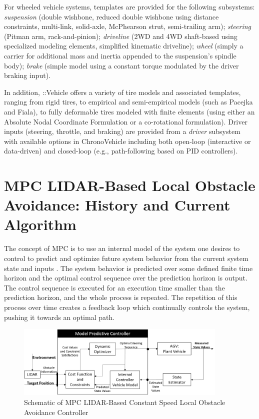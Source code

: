 \documentclass[12pt,onecolumn]{report}
\newcommand{\CHRONO}{{\sffamily{{Chrono}}}}
\newcommand{\ChronoVehicle}{{\sffamily{Chrono}}::Vehicle}
\begin{document}
For wheeled vehicle systems, templates are provided for the following subsystems:
{\em suspension} (double wishbone, reduced double wishbone using distance constraints, multi-link, solid-axle, McPhearson strut, semi-trailing arm);
{\em steering} (Pitman arm, rack-and-pinion);
{\em driveline} (2WD and 4WD shaft-based using specialized {\CHRONO} modeling elements, simplified kinematic driveline);
{\em wheel} (simply a carrier for additional mass and inertia appended to the suspension's spindle body);
{\em brake} (simple model using a constant torque modulated by the driver braking input).

In addition, {\ChronoVehicle} offers a variety of tire models and associated templates, ranging from rigid tires, to empirical and semi-empirical models (such as Pacejka and Fiala), to fully deformable tires modeled with finite elements (using either an Absolute Nodal Coordinate Formulation or a co-rotational formulation).  Driver inputs (steering, throttle, and braking) are provided from a {\em driver} subsystem with available options in {ChronoVehicle} including both open-loop (interactive or data-driven) and closed-loop (e.g., path-following based on PID controllers).


\section{MPC LIDAR-Based Local Obstacle Avoidance: History and Current Algorithm}\label{s:MPC}

The concept of MPC is to use an internal model of the system one desires to control to predict and optimize future system behavior from the current system state and inputs \cite{Allgower&Findeisen2002}. The system behavior is predicted over some defined finite time horizon and the optimal control sequence over the prediction horizon is output. The control sequence is executed for an execution time smaller than the prediction horizon, and the whole process is repeated. The repetition of this process over time creates a feedback loop which continually controls the system, pushing it towards an optimal path.

\begin{figure}
	\centering
	\includegraphics[width=0.9\textwidth]{Figs/MPCBlockDiagram.png}
	\caption{{\small Schematic of MPC LIDAR-Based Constant Speed Local Obstacle Avoidance Controller}}    
	\label{fig:MPC_schematic}
\end{figure}
\end{document}
